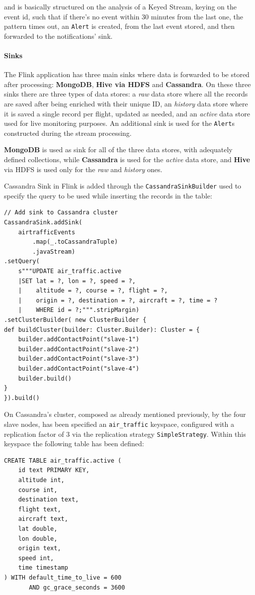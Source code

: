 and is basically structured on the analysis of a Keyed Stream, keying on the event id, such that if there's no event within 30 minutes from the last one, the pattern times out, an \texttt{Alert} is created, from the last event stored, and then forwarded to the notifications' sink.

\paragraph{Sinks}

The Flink application has three main sinks where data is forwarded to be stored after processing: \textbf{MongoDB}, \textbf{Hive via HDFS} and \textbf{Cassandra}. On these three sinks there are three types of data stores: a \textit{raw} data store where all the records are saved after being enriched with their unique ID, an \textit{history} data store where it is saved a single record per flight, updated as needed, and an \textit{active} data store used for live monitoring purposes. An additional sink is used for the \texttt{Alert}s constructed during the stream processing.

\textbf{MongoDB} is used as sink for all of the three data stores, with adequately defined collections, while \textbf{Cassandra} is used for the \textit{active} data store, and \textbf{Hive} via HDFS is used only for the \textit{raw} and \textit{history} ones.

\pagebreak

Cassandra Sink in Flink is added through the \texttt{CassandraSinkBuilder} used to specify the query to be used while inserting the records in the table:
\\
\begin{verbatim}
// Add sink to Cassandra cluster
CassandraSink.addSink(
    airtrafficEvents
        .map(_.toCassandraTuple)
        .javaStream)
.setQuery(
    s"""UPDATE air_traffic.active
    |SET lat = ?, lon = ?, speed = ?,
    |    altitude = ?, course = ?, flight = ?,
    |    origin = ?, destination = ?, aircraft = ?, time = ?
    |    WHERE id = ?;""".stripMargin)
.setClusterBuilder( new ClusterBuilder {
def buildCluster(builder: Cluster.Builder): Cluster = {   
    builder.addContactPoint("slave-1")
    builder.addContactPoint("slave-2")
    builder.addContactPoint("slave-3")
    builder.addContactPoint("slave-4")
    builder.build()
}
}).build()
\end{verbatim}

\pagebreak

On Cassandra's cluster, composed as already mentioned previously, by the four slave nodes, has been specified an \texttt{air\_traffic} keyspace, configured with a replication factor of 3 via the replication strategy \texttt{SimpleStrategy}. Within this keyspace the following table has been defined:
\\
\begin{verbatim}
CREATE TABLE air_traffic.active (
    id text PRIMARY KEY,
    altitude int,
    course int,
    destination text,
    flight text,
    aircraft text,
    lat double,
    lon double,
    origin text,
    speed int,
    time timestamp
) WITH default_time_to_live = 600
       AND gc_grace_seconds = 3600
\end{verbatim}

